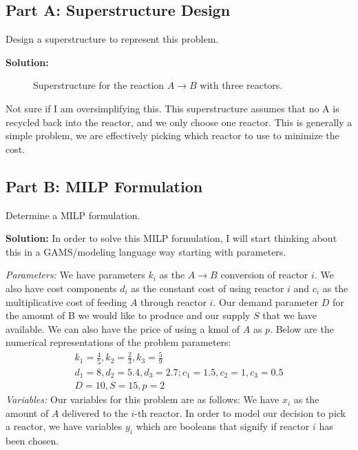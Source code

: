 \documentclass[11pt]{article}
\begin{document}
\subsection{Part A: Superstructure Design}
Design a superstructure to represent this problem.

\textbf{Solution:}
\begin{figure}[htbp]
\centering
{}
\caption{Superstructure for the reaction \( A \rightarrow B \) with three reactors.}
\label{fig:superstructure_reactors}
\end{figure}
Not sure if I am oversimplifying this.
This superstructure assumes that no A is recycled back into the reactor, and we only choose one reactor.
This is generally a simple problem, we are effectively picking which reactor to use to minimize the cost.

\subsection{Part B: MILP Formulation}
Determine a MILP formulation.

\textbf{Solution:}
In order to solve this MILP formulation, I will start thinking about this in a GAMS/modeling language way starting with parameters.

\textit{Parameters:} 
We have parameters $k_i$ as the $A \rightarrow B$ conversion of reactor $i$.
We also have cost components $d_i$ as the constant cost of using reactor $i$ and $c_i$ as the multiplicative cost of feeding $A$ through reactor $i$.
Our demand parameter $D$ for the amount of B we would like to produce and our supply $S$ that we have available.
We can also have the price of using a kmol of $A$ as $p$.
Below are the numerical representations of the problem parameters:
\begin{align*}
  k_1=\frac{4}{5}, k_2=\frac{2}{3}, k_3=\frac{5}{9} \\
  d_1=8, d_2=5.4, d_3=2.7; c_1=1.5, c_2=1, c_3=0.5 \\
  D = 10, S=15, p=2
\end{align*}
\textit{Variables:}
Our variables for this problem are as follows:
We have $x_{i}$ as the amount of $A$ delivered to the $i$-th reactor.
In order to model our decision to pick a reactor, we have variables $y_i$ which are booleans that signify if reactor $i$ has been chosen.
\end{document}
